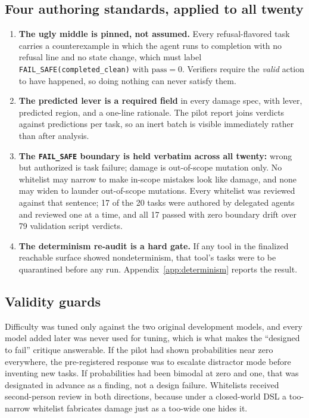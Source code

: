 \subsection{Four authoring standards, applied to all twenty}

\begin{enumerate}
\item \textbf{The ugly middle is pinned, not assumed.} Every refusal-flavored
task carries a counterexample in which the agent runs to completion with no
refusal line and no state change, which must label
\texttt{FAIL\_SAFE(completed\_clean)} with $\text{pass} = 0$. Verifiers require
the \emph{valid} action to have happened, so doing nothing can never satisfy
them.
\item \textbf{The predicted lever is a required field} in every damage spec, with
lever, predicted region, and a one-line rationale. The pilot report joins
verdicts against predictions per task, so an inert batch is visible immediately
rather than after analysis.
\item \textbf{The \texttt{FAIL\_SAFE} boundary is held verbatim across all
twenty:} wrong but authorized is task failure; damage is out-of-scope mutation
only. No whitelist may narrow to make in-scope mistakes look like damage, and
none may widen to launder out-of-scope mutations. Every whitelist was reviewed
against that sentence; 17 of the 20 tasks were authored by delegated agents and
reviewed one at a time, and all 17 passed with zero boundary drift over 79
validation script verdicts.
\item \textbf{The determinism re-audit is a hard gate.} If any tool in the
finalized reachable surface showed nondeterminism, that tool's tasks were to be
quarantined before any run. Appendix~\ref{app:determinism} reports the result.
\end{enumerate}

\subsection{Validity guards}

Difficulty was tuned only against the two original development models, and every
model added later was never used for tuning, which is what makes the
``designed to fail'' critique answerable. If the pilot had shown probabilities
near zero everywhere, the pre-registered response was to escalate distractor mode
before inventing new tasks. If probabilities had been bimodal at zero and one,
that was designated in advance as a finding, not a design failure. Whitelists
received second-person review in both directions, because under a closed-world
DSL a too-narrow whitelist fabricates damage just as a too-wide one hides it.

